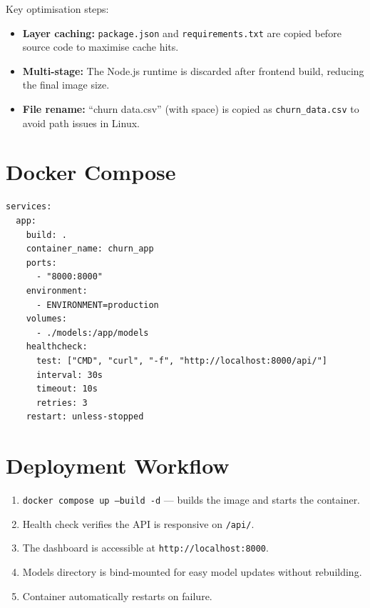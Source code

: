 \documentclass[12pt, a4paper]{report}
\begin{document}
Key optimisation steps:
\begin{itemize}
    \item \textbf{Layer caching:} \texttt{package.json} and \texttt{requirements.txt} are copied before source code to maximise cache hits.
    \item \textbf{Multi-stage:} The Node.js runtime is discarded after frontend build, reducing the final image size.
    \item \textbf{File rename:} ``churn data.csv'' (with space) is copied as \texttt{churn\_data.csv} to avoid path issues in Linux.
\end{itemize}

\section{Docker Compose}

\begin{lstlisting}[language={}, caption={docker-compose.yml}]
services:
  app:
    build: .
    container_name: churn_app
    ports:
      - "8000:8000"
    environment:
      - ENVIRONMENT=production
    volumes:
      - ./models:/app/models
    healthcheck:
      test: ["CMD", "curl", "-f", "http://localhost:8000/api/"]
      interval: 30s
      timeout: 10s
      retries: 3
    restart: unless-stopped
\end{lstlisting}

\section{Deployment Workflow}

\begin{enumerate}
    \item \texttt{docker compose up --build -d} --- builds the image and starts the container.
    \item Health check verifies the API is responsive on \texttt{/api/}.
    \item The dashboard is accessible at \texttt{http://localhost:8000}.
    \item Models directory is bind-mounted for easy model updates without rebuilding.
    \item Container automatically restarts on failure.
\end{enumerate}


\end{document}
